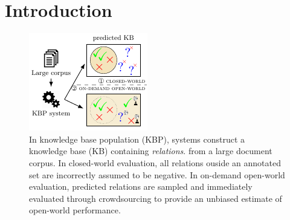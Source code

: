\section{Introduction}
\label{sec:intro}

\begin{figure}[t]
  \includegraphics[width=\columnwidth]{figures/overview}
  \caption{\label{fig:task}
  In knowledge base population (KBP), systems construct a knowledge base (KB) containing \textit{relations}. %
  from a large document corpus.
  In closed-world evaluation, %
  all relations ouside an annotated set are incorrectly assumed to be negative.
  In on-demand open-world evaluation,
  predicted relations are sampled and immediately evaluated through crowdsourcing
  to provide an unbiased estimate of open-world performance. %
  }
\end{figure}

